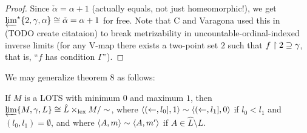\documentclass[11pt]{article}
\newcommand{\lexTimes}{\times_{\textrm{lex}}}
\begin{document}
  \begin{proof}
    Since \(\check\alpha=\alpha+1\) (actually equals, not just homeomorphic!),
    we get \(\varprojlim^\star \{2, \gamma, \alpha\}
      \cong \check\alpha =
    \alpha+1\) for free.
    Note that C and Varagona used this in (TODO create citataion) to break
    metrizability in uncountable-ordinal-indexed inverse limits (for any V-map
    there exists a two-point set \(2\) such that \(f\restriction 2\supseteq\gamma\),
    that is, ``\(f\) has condition \(\Gamma\)'').
  \end{proof}

  \bigskip

  We may generalize theorem 8 as follows:

  \begin{theorem}
    If \(M\) is a LOTS with minimum \(0\) and maximum \(1\),
    then \(\varprojlim\{M,\gamma,L\}\cong \hat L\lexTimes M/\sim\),
    where \(\langle(\leftarrow,l_0],1\rangle\sim\langle(\leftarrow,l_1],0\rangle\) if
    \(l_0<l_1\) and \((l_0,l_1)=\emptyset\),
    and where \(\langle A,m\rangle\sim\langle A,m'\rangle\) if \(A\in\hat L\setminus L\).
  \end{theorem}
\end{document}
